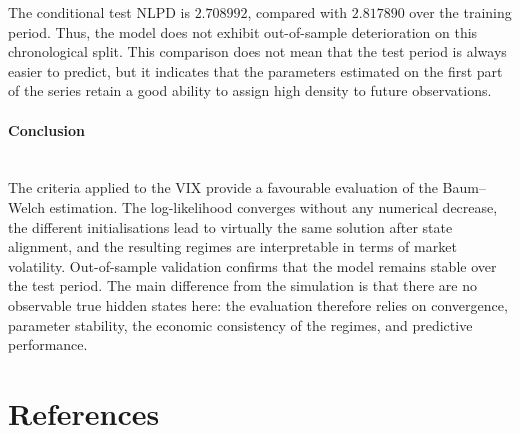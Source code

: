\documentclass[11pt]{article}
\begin{document}
The conditional test NLPD is \(2.708992\), compared with \(2.817890\) over the training period. Thus, the model does not exhibit out-of-sample deterioration on this chronological split. This comparison does not mean that the test period is always easier to predict, but it indicates that the parameters estimated on the first part of the series retain a good ability to assign high density to future observations.

\paragraph{Conclusion}\mbox{}\\

The criteria applied to the VIX provide a favourable evaluation of the Baum--Welch estimation. The log-likelihood converges without any numerical decrease, the different initialisations lead to virtually the same solution after state alignment, and the resulting regimes are interpretable in terms of market volatility. Out-of-sample validation confirms that the model remains stable over the test period. The main difference from the simulation is that there are no observable true hidden states here: the evaluation therefore relies on convergence, parameter stability, the economic consistency of the regimes, and predictive performance.

\section{References}
\end{document}
